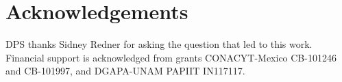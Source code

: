 \documentclass[superscriptaddress,pre,reprint,showpacs,onecolumn]{revtex4-1}
\begin{document}
    
    
    

    

    
\section*{Acknowledgements}


DPS thanks Sidney Redner for asking the question that led to this work. Financial support is acknowledged from grants CONACYT-Mexico CB-101246 and CB-101997, and DGAPA-UNAM PAPIIT IN117117.






\end{document}
